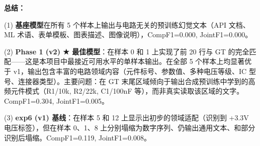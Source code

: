 \textbf{总结：}

(1) \textbf{基座模型}在所有 5 个样本上输出与电路无关的预训练幻觉文本（API 文档、ML 术语、表单模板、图表描述、图像说明），CompF1=0.000, JointF1=0.000。

(2) \textbf{Phase 1 (v2) ★ 最佳模型}：在样本 0 和 1 上实现了前 20 行与 GT 的完全匹配——这是本项目中最接近可用水平的单样本输出。在全部 5 个样本上均显著优于 v1，输出包含丰富的电路领域内容（元件标号、参数值、多种电压等级、IC 型号、连接器类型）。主要问题：在 GT 末尾区域倾向于输出合成预训练中学到的高频元件模式（R1/10k, R2/22k, C1/100nF 等），而非真实读取该区域的文字。CompF1=0.304, JointF1=0.005。

(3) \textbf{exp6 (v1) 基线}：在样本 5 和 12 上显示出初步的领域适配（识别到 +3.3V 电压标签），但在样本 0、1、8 上分别塌缩为数字序列、仍输出通用文本、和部分识别后塌缩。CompF1=0.119, JointF1=0.008。



